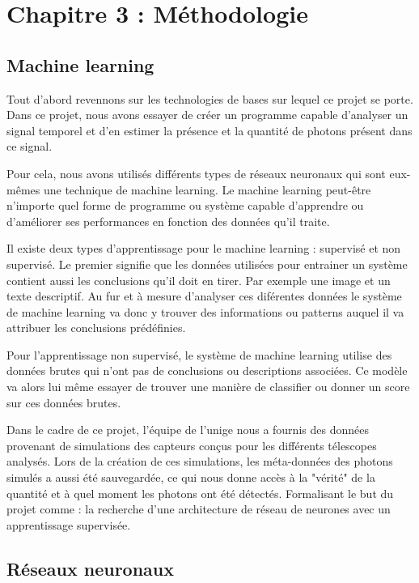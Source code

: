 \chapter{Chapitre 3 : Méthodologie}

\section{Machine learning}

Tout d'abord revennons sur les technologies de bases sur lequel ce projet se porte. 
Dans ce projet, nous avons essayer de créer un programme capable d'analyser un signal temporel et 
d'en estimer la présence et la quantité de photons présent dans ce signal.

Pour cela, nous avons utilisés différents types de réseaux neuronaux qui sont eux-mêmes une technique de machine learning.
Le machine learning peut-être n'importe quel forme de programme ou système capable d'apprendre ou d'améliorer ses performances
en fonction des données qu'il traite.

Il existe deux types d'apprentissage pour le machine learning : supervisé et non supervisé.
Le premier signifie que les données utilisées pour entrainer un système contient aussi les conclusions qu'il doit en tirer.
Par exemple une image et un texte descriptif. Au fur et à mesure d'analyser ces diférentes données le système de machine learning
va donc y trouver des informations ou patterns auquel il va attribuer les conclusions prédéfinies.

Pour l'apprentissage non supervisé, le système de machine learning utilise des données brutes qui n'ont pas de conclusions ou descriptions associées.
Ce modèle va alors lui même essayer de trouver une manière de classifier ou donner un score sur ces données brutes.

Dans le cadre de ce projet, l'équipe de l'\gls{unige} nous a fournis des données provenant de simulations des capteurs conçus pour les différents télescopes analysés.
Lors de la création de ces simulations, les méta-données des photons simulés a aussi été sauvegardée, ce qui nous donne accès
à la "vérité" de la quantité et à quel moment les photons ont été détectés. 
Formalisant le but du projet comme : la recherche d'une architecture de réseau de neurones avec un apprentissage supervisée.

\section{Réseaux neuronaux}

